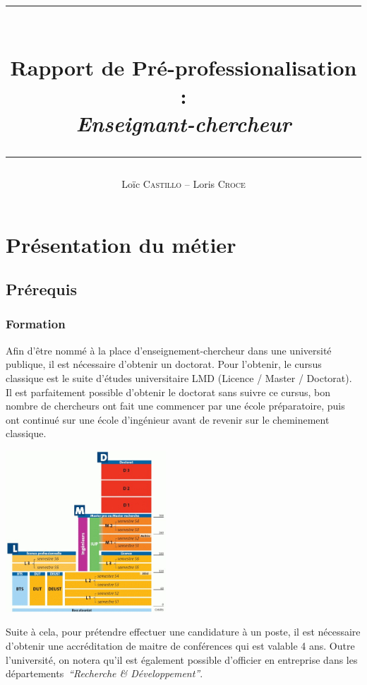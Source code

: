 \documentclass[12pt, a4paper]{report}
\author{Loïc \textsc{Castillo} -- Loris \textsc{Croce}}
\title{\rule{\textwidth}{1pt} \\ \Huge\textbf{Rapport de Pré-professionalisation : } \\ \emph{Enseignant-chercheur} \rule{\textwidth}{1pt}}
\newenvironment{Figure}
  {\par\medskip\noindent\minipage{\linewidth}}
  {\endminipage\par\medskip}
\begin{document}
\maketitle{}

\tableofcontents

\chapter{Présentation du métier}

  \section{Prérequis}

    \subsection{Formation}

    Afin d'être nommé à la place d'enseignement-chercheur dans une université publique, il est nécessaire d'obtenir un doctorat. Pour l'obtenir, le cursus classique est le suite d'études universitaire LMD (Licence / Master / Doctorat).
    Il est parfaitement possible d'obtenir le doctorat sans suivre ce cursus, bon nombre de chercheurs ont fait une commencer par une école préparatoire, puis ont continué sur une école d'ingénieur avant de revenir sur le cheminement classique.

    \begin{Figure}
      \centering
      \includegraphics[width=6cm]{lmd.jpg}
    \end{Figure}

    \medskip

    Suite à cela, pour prétendre effectuer une candidature à un poste, il est nécessaire d'obtenir une accréditation de maitre de conférences qui est valable 4 ans.
		Outre l'université, on notera qu'il est également possible d'officier en entreprise dans les départements\ \emph{“Recherche \& Développement”}.
\end{document}
